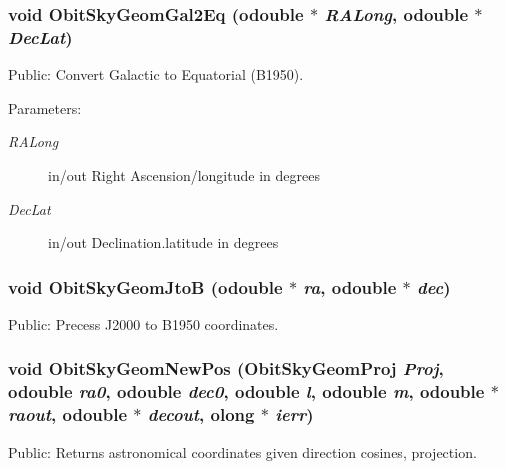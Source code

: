 \subsubsection{\setlength{\rightskip}{0pt plus 5cm}void Obit\-Sky\-Geom\-Gal2Eq ({\bf odouble} $\ast$ {\em RALong}, {\bf odouble} $\ast$ {\em Dec\-Lat})}\label{ObitSkyGeom_8h_a22}


Public: Convert Galactic to Equatorial (B1950). 

\begin{Desc}
\item[Parameters:]
\begin{description}
\item[{\em RALong}]in/out Right Ascension/longitude in degrees \item[{\em Dec\-Lat}]in/out Declination.latitude in degrees \end{description}
\end{Desc}
\subsubsection{\setlength{\rightskip}{0pt plus 5cm}void Obit\-Sky\-Geom\-Jto\-B ({\bf odouble} $\ast$ {\em ra}, {\bf odouble} $\ast$ {\em dec})}\label{ObitSkyGeom_8h_a20}


Public: Precess J2000 to B1950 coordinates. 

\subsubsection{\setlength{\rightskip}{0pt plus 5cm}void Obit\-Sky\-Geom\-New\-Pos (Obit\-Sky\-Geom\-Proj {\em Proj}, {\bf odouble} {\em ra0}, {\bf odouble} {\em dec0}, {\bf odouble} {\em l}, {\bf odouble} {\em m}, {\bf odouble} $\ast$ {\em raout}, {\bf odouble} $\ast$ {\em decout}, {\bf olong} $\ast$ {\em ierr})}\label{ObitSkyGeom_8h_a12}


Public: Returns astronomical coordinates given direction cosines, projection. 

